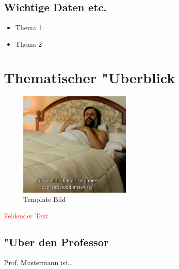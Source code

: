 \documentclass[]{scrartcl}
\begin{document}
\subsection{Wichtige Daten etc.}

\begin{itemize}
    \item Thema 1
    \item Thema 2
  \end{itemize}
\newpage
\section{Thematischer "Uberblick}


\begin{figure}[h]
	\centering
	\includegraphics[width=0.5\textwidth]{images/template.png}
	\caption{Template Bild}
	\label{fig:template}
\end{figure}


\textcolor{red}{Fehlender Text}


\newpage
\subsection{"Uber den Professor}
Prof. Mustermann ist..
\end{document}
